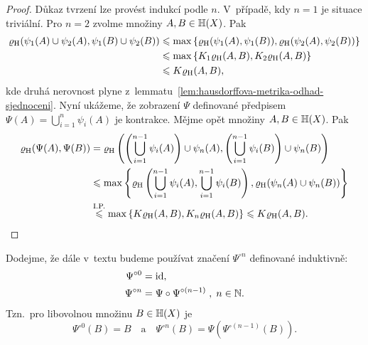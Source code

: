 \begin{proof}
    Důkaz tvrzení lze provést indukcí podle $n$. V~případě, kdy $n=1$ je situace triviální. Pro $n=2$ zvolme množiny $A,B\in\mathbb{H}(X)$. Pak
    \begin{align*}
        \varrho_\textup{H}(\psi_1(A)\cup\psi_2(A),\psi_1(B)\cup\psi_2(B))&\leqslant\max\left\{\varrho_\textup{H}(\psi_1(A),\psi_1(B)),\varrho_\textup{H}(\psi_2(A),\psi_2(B))\right\}\\
        &\leqslant\max\left\{K_1\varrho_\textup{H}(A,B),K_2\varrho_\textup{H}(A,B)\right\}\\
        &\leqslant K\varrho_\textup{H}(A,B),
    \end{align*}
    kde druhá nerovnost plyne z~lemmatu~\ref{lem:hausdorffova-metrika-odhad-sjednoceni}. Nyní ukážeme, že zobrazení $\Psi
    $ definované předpisem $\Psi(A)=\bigcup_{i=1}^n\psi_i(A)$ je kontrakce. Mějme opět množiny $A,B\in\mathbb{H}(X)$. Pak
    \begin{align*}
        \varrho_\textup{H}(\Psi(A),\Psi(B))&=\varrho_\textup{H}\left(\left(\bigcup_{i=1}^{n-1}\psi_i(A)\right)\cup\psi_n(A),\left(\bigcup_{i=1}^{n-1}\psi_i(B)\right)\cup\psi_n(B)\right)\\
        &\leqslant\max\left\{\varrho_\textup{H}\left(\bigcup_{i=1}^{n-1}\psi_i(A),\bigcup_{i=1}^{n-1}\psi_i(B)\right),\varrho_\textup{H}(\psi_n(A)\cup\psi_n(B))\right\}\\
        &\stackrel{\text{I.P.}}{\leqslant}\max\left\{K\varrho_\textup{H}(A,B),K_n\varrho_\textup{H}(A,B)\right\}\leqslant K\varrho_\textup{H}(A,B).
    \end{align*}
\end{proof}
\begin{remark}
    Dodejme, že dále v~textu budeme používat značení $\Psi^{\circ n}$ definované induktivně:
    \begin{align*}
        \Psi^{\circ 0}&=\operatorname{id},\\
        \Psi^{\circ n}&=\Psi\circ\Psi^{\circ(n-1)}\;,\;n\in\mathbb{N}.
    \end{align*}
    Tzn.~pro libovolnou množinu $B\in\mathbb{H}(X)$ je
    \[\Psi^{\circ 0}(B)=B\quad\text{a}\quad\Psi^{\circ n}(B)=\Psi(\Psi^{\circ(n-1)}(B)).\]
\end{remark}

